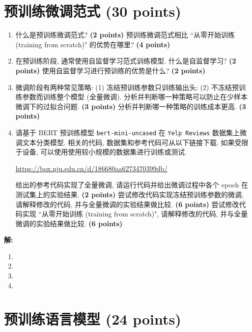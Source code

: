 \documentclass[8pt]{article}
\newcommand{\points}[1]{\textbf{(#1 points)}}
\begin{document}
\section{预训练微调范式 (30 points)}
\label{sec:ii}

{\color{gray}\begin{enumerate}
    \item 什么是预训练微调范式? \points{2} 预训练微调范式相比 ``从零开始训练 (training from scratch)" 的优势在哪里? \points{4}
    \item 在预训练阶段, 通常使用自监督学习范式训练模型. 什么是自监督学习? \points{2} 使用自监督学习进行预训练的优势是什么? \points{2}
    \item 微调阶段有两种常见策略: (1) 冻结预训练参数只训练输出头; (2) 不冻结预训练参数而训练整个模型 (全量微调). 分析并判断哪一种策略可以防止在少样本微调下的过拟合问题. \points{3} 分析并判断哪一种策略的训练成本更高. \points{3}
    \item 请基于 BERT 预训练模型 \texttt{bert-mini-uncased} 在 \texttt{Yelp Reviews} 数据集上微调文本分类模型. 相关的代码, 数据集和参考代码可从以下链接下载. 如果受限于设备, 可以使用使用较小规模的数据集进行训练或测试. 
    
    \url{https://box.nju.edu.cn/d/186680aa6273470399db/}

    给出的参考代码实现了全量微调, 请运行代码并给出微调过程中各个 epoch 在测试集上的实验结果. \points{2}
    尝试修改代码实现冻结预训练参数的微调, 请解释修改的代码, 并与全量微调的实验结果做比较. \points{6}
    尝试修改代码实现 ``从零开始训练 (training from scratch)", 请解释修改的代码, 并与全量微调的实验结果做比较. \points{6}
\end{enumerate}}

\textbf{\large 解:}
\begin{enumerate}
    \item %
    \item %
    \item %
    \item %
\end{enumerate}

\vspace{12em}

\section{预训练语言模型 (24 points)}
\end{document}
